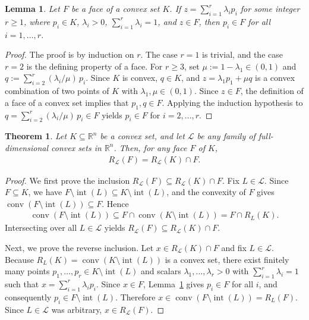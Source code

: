 \documentclass{article}
\newtheorem{theorem}{Theorem}
\newtheorem{lemma}{Lemma}
\newcommand{\R}{\mathbb{R}}
\renewcommand{\L}{\mathcal{L}}
\begin{document}
\begin{lemma} \label{lemma:face-decomposition}
    Let $F$ be a face of a convex set $K$. If $z = \sum_{i=1}^{r} \lambda_i p_i$ for some integer $r \geq 1$, where $p_i \in K$, $\lambda_i > 0$, $\sum_{i=1}^{r} \lambda_i = 1$, and $z \in F$, then $p_i \in F$ for all $i = 1,\ldots,r$.
\end{lemma}

\begin{proof}
    The proof is by induction on $r$. The case $r = 1$ is trivial, and the case $r = 2$ is the defining property of a face. For $r \geq 3$, set $\mu := 1 - \lambda_1 \in (0,1)$ and $q := \sum_{i=2}^{r} (\lambda_i/\mu)\, p_i$. Since $K$ is convex, $q \in K$, and $z = \lambda_1 p_1 + \mu q$ is a convex combination of two points of $K$ with $\lambda_1, \mu \in (0,1)$. Since $z \in F$, the definition of a face of a convex set implies that $p_1, q \in F$. Applying the induction hypothesis to $q = \sum_{i=2}^{r} (\lambda_i/\mu)\, p_i \in F$ yields $p_i \in F$ for $i = 2,\ldots,r$.
\end{proof}

\begin{theorem} \label{thm:L-closure-hered}
    Let $K \subseteq \R^n$ be a convex set, and let $\L$ be any family of full-dimensional convex sets in $\R^n$. Then, for any face $F$ of $K$, 
    \begin{align}
        R_\L(F) = R_\L(K) \cap F.
    \end{align}
\end{theorem}

\begin{proof}
    We first prove the inclusion $R_\L(F) \subseteq R_\L(K) \cap F$. Fix $L \in \L$. Since $F \subseteq K$, we have $F \setminus \operatorname{int}(L) \subseteq K \setminus \operatorname{int}(L)$, and the convexity of $F$ gives $\operatorname{conv}(F \setminus \operatorname{int}(L)) \subseteq F$. Hence
    \begin{align}
        \operatorname{conv}(F \setminus \operatorname{int}(L)) \subseteq F \cap \operatorname{conv}(K \setminus \operatorname{int}(L)) = F \cap R_L(K).
    \end{align}
    Intersecting over all $L \in \L$ yields $R_\L(F) \subseteq R_\L(K) \cap F$.

    Next, we prove the reverse inclusion. Let $x \in R_\L(K) \cap F$ and fix $L \in \L$. Because $R_L(K) = \operatorname{conv}(K \setminus \operatorname{int}(L))$ is a convex set, there exist finitely many points $p_1,\ldots,p_r \in K \setminus \operatorname{int}(L)$ and scalars $\lambda_1,\ldots,\lambda_r > 0$ with $\sum_{i=1}^{r} \lambda_i = 1$ such that $x = \sum_{i=1}^{r} \lambda_i p_i$. Since $x \in F$, Lemma~\ref{lemma:face-decomposition} gives $p_i \in F$ for all $i$, and consequently $p_i \in F \setminus \operatorname{int}(L)$. Therefore $x \in \operatorname{conv}(F \setminus \operatorname{int}(L)) = R_L(F)$. Since $L \in \L$ was arbitrary, $x \in R_\L(F)$.
\end{proof}
\end{document}
